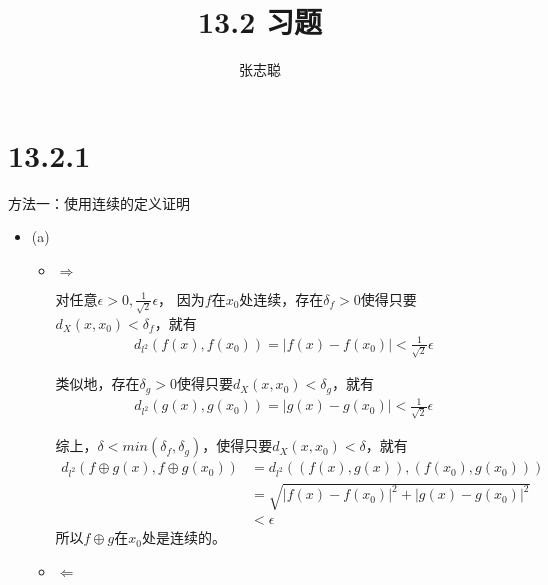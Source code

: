 \documentclass{article}
\begin{document}
\title{13.2 习题}
\author{张志聪}
\maketitle

\section*{13.2.1}

方法一：使用连续的定义证明

\begin{itemize}
  \item (a)

        \begin{itemize}
          \item $\Rightarrow$

                对任意$\epsilon > 0, \frac{1}{\sqrt{2}}\epsilon$，
                因为$f$在$x_0$处连续，存在$\delta_{f} > 0$使得只要$d_X(x, x_0) < \delta_{f}$，就有
                \begin{align*}
                  d_{l^2}(f(x), f(x_0)) = |f(x) - f(x_0)| < \frac{1}{\sqrt{2}}\epsilon
                \end{align*}

                类似地，存在$\delta_{g} > 0$使得只要$d_X(x, x_0) < \delta_{g}$，就有
                \begin{align*}
                  d_{l^2}(g(x), g(x_0)) = |g(x) - g(x_0)| < \frac{1}{\sqrt{2}}\epsilon
                \end{align*}

                综上，$\delta < min(\delta_{f}, \delta_{g})$，使得只要$d_X(x, x_0) < \delta$，就有
                \begin{align*}
                  d_{l^2}(f \oplus g(x), f \oplus g(x_0)) & = d_{l^2}((f(x), g(x)), (f(x_0), g(x_0)))      \\
                                                          & = \sqrt{|f(x) - f(x_0)|^2 + |g(x) - g(x_0)|^2} \\
                                                          & < \epsilon
                \end{align*}
                所以$f \oplus g$在$x_0$处是连续的。

          \item $\Leftarrow$


\end{itemize}
\end{itemize}
\end{document}
